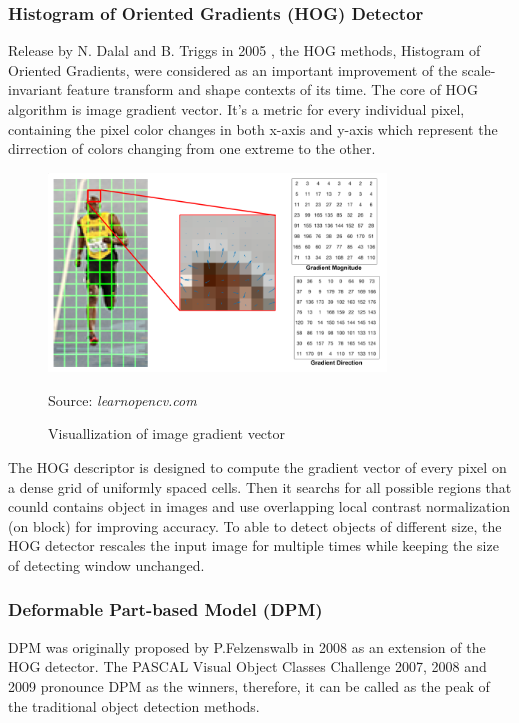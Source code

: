 \documentclass[12pt]{article}
\newcommand{\source}[1]{\caption*{Source: \emph{#1}} }
\begin{document}
\subsubsection{Histogram of Oriented Gradients (HOG) Detector}
\label{sec:hog}
Release by N. Dalal and B. Triggs in 2005 \cite{dalal2005histograms}, the HOG methods,
Histogram of Oriented Gradients, were considered as an important improvement of the 
scale-invariant feature transform and shape contexts of its time. The core of HOG 
algorithm is image gradient vector. It's a metric for every individual pixel, containing
the pixel color changes in both x-axis and y-axis which represent the dirrection of colors 
changing from one extreme to the other. 
\begin{figure}[htp]
    \centering
    \includegraphics[width=0.8\textwidth]{images/vector_gradient.png}
    \caption{Visuallization of image gradient vector}
    \label{fig:gradient}
    \source{learnopencv.com}
\end{figure}

The HOG descriptor is designed to compute the gradient vector of every pixel 
on a dense grid of uniformly spaced cells. Then it searchs for all possible regions 
that counld contains object in images and use overlapping local contrast normalization 
(on block) for improving accuracy. To able to detect objects of different size, the 
HOG detector rescales the input image for multiple times while keeping the size of 
detecting window unchanged.

\subsubsection{Deformable Part-based Model (DPM)}
\label{sec:dpm}
DPM was originally proposed by P.Felzenswalb in 2008 \cite{felzenszwalb2008discriminatively}
as an extension of the HOG detector. The PASCAL Visual Object Classes Challenge 2007, 
2008 and 2009 pronounce DPM as the winners, therefore, it can be called as the peak 
of the traditional object detection methods. 
\end{document}
